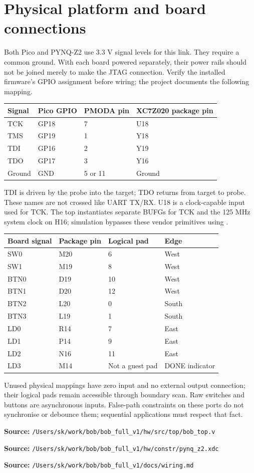 \documentclass[11pt,a4paper]{article}
\newcommand{\code}[1]{\texttt{\detokenize{#1}}}
\newcommand{\src}[1]{\par\smallskip\noindent\textbf{Source: }\nolinkurl{/Users/sk/work/bob/bob_full_v1/#1}\par\smallskip}
\begin{document}
\section{Physical platform and board connections}
Both Pico and PYNQ-Z2 use 3.3 V signal levels for this link. They require a common
ground. With each board powered separately, their power rails should not be
joined merely to make the JTAG connection. Verify the installed firmware's GPIO
assignment before wiring; the project documents the following mapping.
\begin{center}
\begin{tabular}{llll}
\toprule
Signal & Pico GPIO & PMODA pin & XC7Z020 package pin\\
\midrule
TCK & GP18 & 7 & U18\\
TMS & GP19 & 1 & Y18\\
TDI & GP16 & 2 & Y19\\
TDO & GP17 & 3 & Y16\\
Ground & GND & 5 or 11 & Ground\\
\bottomrule
\end{tabular}
\end{center}
TDI is driven by the probe into the target; TDO returns from target to probe.
These names are not crossed like UART TX/RX. U18 is a clock-capable input used
for TCK. The top instantiates separate BUFGs for TCK and the 125 MHz system clock
on H16; simulation bypasses these vendor primitives using \code{SIMULATION}.

\begin{center}
\begin{tabular}{llll}
\toprule
Board signal & Package pin & Logical pad & Edge\\
\midrule
SW0 & M20 & 6 & West\\
SW1 & M19 & 8 & West\\
BTN0 & D19 & 10 & West\\
BTN1 & D20 & 12 & West\\
BTN2 & L20 & 0 & South\\
BTN3 & L19 & 1 & South\\
LD0 & R14 & 7 & East\\
LD1 & P14 & 9 & East\\
LD2 & N16 & 11 & East\\
LD3 & M14 & Not a guest pad & DONE indicator\\
\bottomrule
\end{tabular}
\end{center}
Unused physical mappings have zero input and no external output connection;
their logical pads remain accessible through boundary scan. Raw switches and
buttons are asynchronous inputs. False-path constraints on these ports do not
synchronise or debounce them; sequential applications must respect that fact.
\src{hw/src/top/bob_top.v}
\src{hw/constr/pynq_z2.xdc}
\src{docs/wiring.md}
\end{document}
